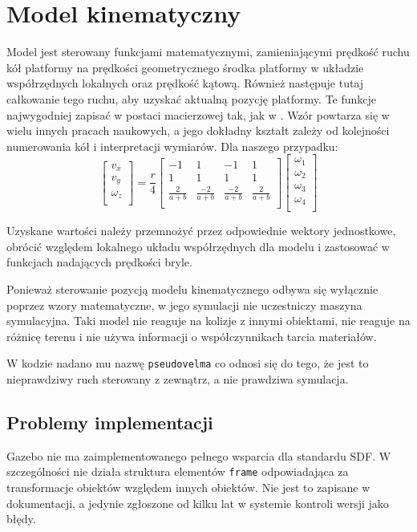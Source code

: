 \section{Model kinematyczny}
	\label{sec:pseudovelma}
	Model jest sterowany funkcjami matematycznymi, zamieniającymi prędkość ruchu kół platformy na prędkości geometrycznego środka platformy w układzie współrzędnych lokalnych oraz prędkość kątową. Również następuje tutaj całkowanie tego ruchu, aby uzyskać aktualną pozycję platformy.
	Te funkcje najwygodniej zapisać w postaci macierzowej tak, jak w \cite{wheels}. Wzór powtarza się w wielu innych pracach naukowych, a jego dokładny kształt zależy od kolejności numerowania kół i interpretacji wymiarów.
	Dla naszego przypadku:
	\[
	\begin{bmatrix}
	v_x \\
	v_y \\
	\omega_z \\
	\end{bmatrix}
	=
	\frac{r}{4}
	\begin{bmatrix}
	-1 & 1 & -1 & 1 \\
	1 & 1 & 1 & 1 \\
	\frac{2}{a+b} & \frac{-2}{a+b} & \frac{-2}{a+b} & \frac{2}{a+b} \\
	\end{bmatrix}
	\begin{bmatrix}
	\omega_1 \\
	\omega_2 \\
	\omega_3 \\
	\omega_4 \\
	\end{bmatrix}
	\]

	Uzyskane wartości należy przemnożyć przez odpowiednie wektory jednostkowe, obrócić względem lokalnego układu współrzędnych dla modelu i zastosować w funkcjach nadających prędkości bryle.

	Ponieważ sterowanie pozycją modelu kinematycznego odbywa się wyłącznie poprzez wzory matematyczne, w jego symulacji nie uczestniczy maszyna symulacyjna.
	Taki model nie reaguje na kolizje z innymi obiektami, nie reaguje na różnicę terenu i nie używa informacji o współczynnikach tarcia materiałów.

	W kodzie nadano mu nazwę \texttt{pseudovelma} co odnosi się do tego, że jest to nieprawdziwy ruch sterowany z zewnątrz, a nie prawdziwa symulacja.

	\subsection{Problemy implementacji}
		Gazebo nie ma zaimplementowanego pełnego wsparcia dla standardu SDF.
		W szczególności nie działa struktura elementów \texttt{frame} odpowiadająca za transformacje obiektów względem innych obiektów.
		Nie jest to zapisane w dokumentacji, a jedynie zgłoszone od kilku lat w systemie kontroli wersji jako błędy.

